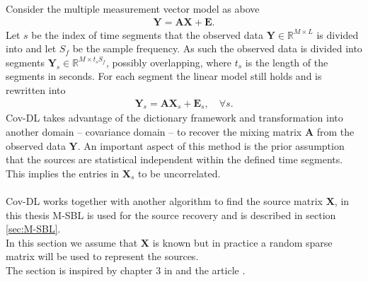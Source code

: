 Consider the multiple measurement vector model as above
\begin{align*}
\mathbf{Y} = \mathbf{AX}+\textbf{E}.
\end{align*}
Let $s$ be the index of time segments that the observed data $\mathbf{Y}\in \mathbb{R}^{M\times L}$ is divided into and let $S_f$ be the sample frequency. As such the observed data is divided into segments $\mathbf{Y}_s \in \mathbb{R}^{M \times t_s S_f}$, possibly overlapping, where $t_s$ is the length of the segments in seconds. For each segment the linear model still holds and is rewritten into
\begin{align*}
\mathbf{Y}_s = \mathbf{AX}_s + \textbf{E}_s, \quad \forall s.
\end{align*}
Cov-DL takes advantage of the dictionary framework and transformation into another domain -- covariance domain -- to recover the mixing matrix $\mathbf{A}$ from the observed data $\mathbf{Y}$. An important aspect of this method is the prior assumption that the sources are statistical independent within the defined time segments. This implies the entries in $\textbf{X}_s$ to be uncorrelated.\\  
\\
Cov-DL works together with another algorithm to find the source matrix $\mathbf{X}$, in this thesis M-SBL is used for the source recovery and is described in section \ref{sec:M-SBL}. 
\\
In this section we assume that $\mathbf{X}$ is known but in practice a random sparse matrix will be used to represent the sources. 
\\
The section is inspired by chapter 3 in \cite{phd2015} and the article \cite{Balkan2015}.


